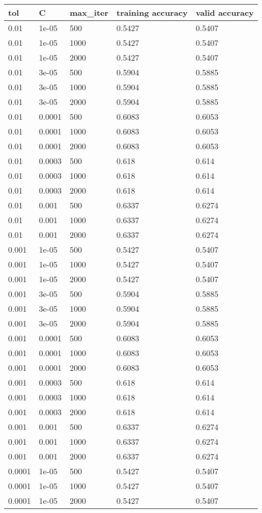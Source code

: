 \documentclass{article}%
\begin{document}
%
\normalsize%
\begin{longtable}{l l l l l}%
\hline%
tol&C&max\_iter&training accuracy&valid accuracy\\%
\hline%
\endhead%
\hline%
0.01&1e{-}05&500&0.5427&0.5407\\%
0.01&1e{-}05&1000&0.5427&0.5407\\%
0.01&1e{-}05&2000&0.5427&0.5407\\%
0.01&3e{-}05&500&0.5904&0.5885\\%
0.01&3e{-}05&1000&0.5904&0.5885\\%
0.01&3e{-}05&2000&0.5904&0.5885\\%
0.01&0.0001&500&0.6083&0.6053\\%
0.01&0.0001&1000&0.6083&0.6053\\%
0.01&0.0001&2000&0.6083&0.6053\\%
0.01&0.0003&500&0.618&0.614\\%
0.01&0.0003&1000&0.618&0.614\\%
0.01&0.0003&2000&0.618&0.614\\%
0.01&0.001&500&0.6337&0.6274\\%
0.01&0.001&1000&0.6337&0.6274\\%
0.01&0.001&2000&0.6337&0.6274\\%
0.001&1e{-}05&500&0.5427&0.5407\\%
0.001&1e{-}05&1000&0.5427&0.5407\\%
0.001&1e{-}05&2000&0.5427&0.5407\\%
0.001&3e{-}05&500&0.5904&0.5885\\%
0.001&3e{-}05&1000&0.5904&0.5885\\%
0.001&3e{-}05&2000&0.5904&0.5885\\%
0.001&0.0001&500&0.6083&0.6053\\%
0.001&0.0001&1000&0.6083&0.6053\\%
0.001&0.0001&2000&0.6083&0.6053\\%
0.001&0.0003&500&0.618&0.614\\%
0.001&0.0003&1000&0.618&0.614\\%
0.001&0.0003&2000&0.618&0.614\\%
0.001&0.001&500&0.6337&0.6274\\%
0.001&0.001&1000&0.6337&0.6274\\%
0.001&0.001&2000&0.6337&0.6274\\%
0.0001&1e{-}05&500&0.5427&0.5407\\%
0.0001&1e{-}05&1000&0.5427&0.5407\\%
0.0001&1e{-}05&2000&0.5427&0.5407\\%

\end{longtable}
\end{document}
